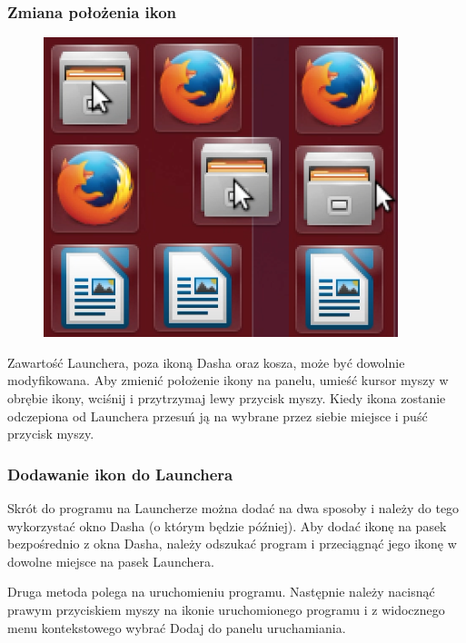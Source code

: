 \subsubsection{Zmiana położenia ikon}
\begin{figure}
	\vspace{-10pt}
	\includegraphics[width=\linewidth]{images/unity_launcher_zmiana_polozenia_ikon.png}
\end{figure}

Zawartość Launchera, poza ikoną Dasha oraz kosza, może być dowolnie modyfikowana. Aby zmienić położenie ikony na panelu, umieść kursor myszy w obrębie ikony, wciśnij i przytrzymaj lewy przycisk myszy. Kiedy ikona zostanie odczepiona od Launchera przesuń ją na wybrane przez siebie miejsce i puść przycisk myszy.

\subsubsection{Dodawanie ikon do Launchera}
Skrót do programu na Launcherze można dodać na dwa sposoby i należy do tego wykorzystać okno Dasha (o którym będzie później). Aby dodać ikonę na pasek bezpośrednio z okna Dasha, należy odszukać program i przeciągnąć jego ikonę w dowolne miejsce na pasek Launchera.

Druga metoda polega na uruchomieniu programu. Następnie należy nacisnąć prawym przyciskiem myszy na ikonie uruchomionego programu i z widocznego menu kontekstowego wybrać \textcolor{ubuntu_orange}{Dodaj do panelu uruchamiania}.

